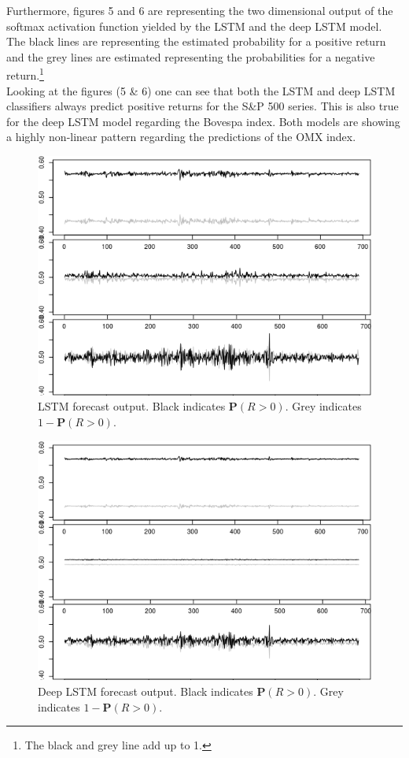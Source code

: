 \documentclass[12pt, letterpaper]{amsart}%
\begin{document}
Furthermore, figures 5 and 6 are representing the two dimensional output of the softmax activation function yielded by the LSTM and the deep LSTM model. The black lines are representing the estimated probability for a positive return and the grey lines are estimated representing the probabilities for a negative return.\footnote{The black and grey line add up to 1.}
\\

Looking at the figures (5 \& 6) one can see that both the LSTM and deep LSTM classifiers always predict positive returns for the S\&P 500 series. This is also true for the deep LSTM model regarding the Bovespa index. Both models are showing a highly non-linear pattern regarding the predictions of the OMX index.

\begin{figure}[H]
\caption{LSTM forecast output. Black indicates $\mathbf{P}(R>0)$. Grey indicates $1 - \mathbf{P}(R>0)$.}
\centering
\includegraphics[scale=0.5]{lstm_prob.png}
\end{figure}

\begin{figure}[H]
\caption{Deep LSTM forecast output. Black indicates $\mathbf{P}(R>0)$. Grey indicates $1 - \mathbf{P}(R>0)$.}
\centering
\includegraphics[scale=0.5]{lstm_deep_prob.png}
\end{figure}
\end{document}
